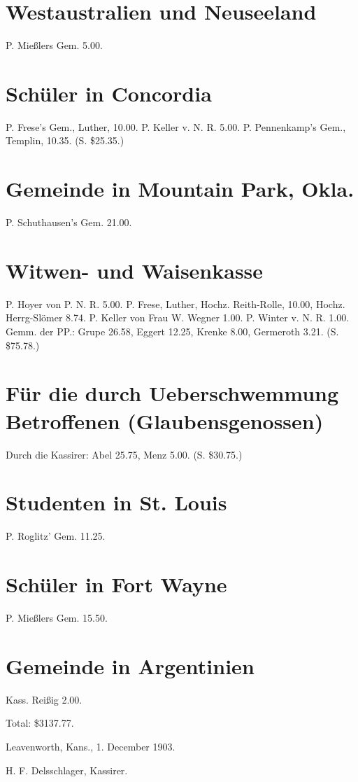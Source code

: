 \section{Westaustralien und Neuseeland}
P. Mießlers Gem. 5.00.

\section{Schüler in Concordia}
P. Frese’s Gem., Luther, 10.00. P. Keller v. N. R. 5.00. P. Pennenkamp’s Gem., Templin, 10.35. (S. \$25.35.)

\section{Gemeinde in Mountain Park, Okla.}
P. Schuthausen’s Gem. 21.00.

\section{Witwen- und Waisenkasse}
P. Hoyer von P. N. R. 5.00. P. Frese, Luther, Hochz. Reith-Rolle, 10.00, Hochz. Herrg-Slömer 8.74. P. Keller von Frau W. Wegner 1.00. P. Winter v. N. R. 1.00. Gemm. der PP.: Grupe 26.58, Eggert 12.25, Krenke 8.00, Germeroth 3.21. (S. \$75.78.)

\section{Für die durch Ueberschwemmung Betroffenen (Glaubensgenossen)}
Durch die Kassirer: Abel 25.75, Menz 5.00. (S. \$30.75.)

\section{Studenten in St. Louis}
P. Roglitz’ Gem. 11.25.

\section{Schüler in Fort Wayne}
P. Mießlers Gem. 15.50.

\section{Gemeinde in Argentinien}
Kass. Reißig 2.00.

Total: \$3137.77.

Leavenworth, Kans., 1. December 1903.

H. F. Delsschlager, Kassirer.
